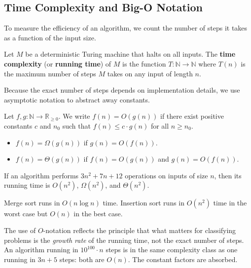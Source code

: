 \subsection{Time Complexity and Big-O Notation}

To measure the efficiency of an algorithm, we count the number of steps it takes as a function of the input size.

\begin{definition}
Let $M$ be a deterministic Turing machine that halts on all inputs. The \textbf{time complexity} (or \textbf{running time}) of $M$ is the function $T: \mathbb{N} \to \mathbb{N}$ where $T(n)$ is the maximum number of steps $M$ takes on any input of length $n$.
\end{definition}

Because the exact number of steps depends on implementation details, we use asymptotic notation to abstract away constants.

\begin{definition}
Let $f, g: \mathbb{N} \to \mathbb{R}_{\geq 0}$. We write $f(n) = O(g(n))$ if there exist positive constants $c$ and $n_0$ such that $f(n) \leq c \cdot g(n)$ for all $n \geq n_0$.
\end{definition}

\begin{definition}
\begin{itemize}
  \item $f(n) = \Omega(g(n))$ if $g(n) = O(f(n))$.
  \item $f(n) = \Theta(g(n))$ if $f(n) = O(g(n))$ and $g(n) = O(f(n))$.
\end{itemize}
\end{definition}

\begin{example}
If an algorithm performs $3n^2 + 7n + 12$ operations on inputs of size $n$, then its running time is $O(n^2)$, $\Omega(n^2)$, and $\Theta(n^2)$.
\end{example}

\begin{example}
Merge sort runs in $O(n \log n)$ time. Insertion sort runs in $O(n^2)$ time in the worst case but $O(n)$ in the best case.
\end{example}

The use of $O$-notation reflects the principle that what matters for classifying problems is the \emph{growth rate} of the running time, not the exact number of steps. An algorithm running in $10^{100} \cdot n$ steps is in the same complexity class as one running in $3n + 5$ steps: both are $O(n)$. The constant factors are absorbed.

